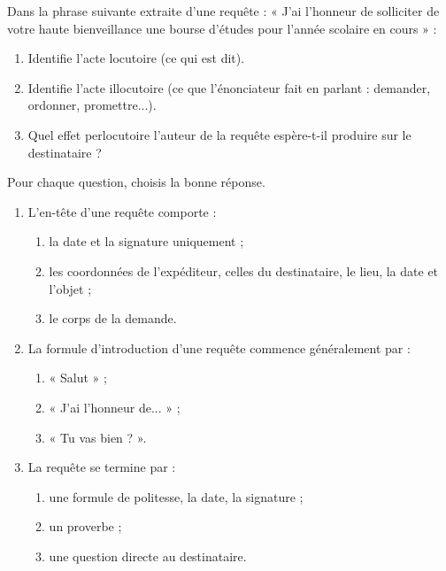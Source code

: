 \documentclass[11pt]{article}
\begin{document}
\begin{exercice}
Dans la phrase suivante extraite d'une requête : « J'ai l'honneur de solliciter de votre haute bienveillance une bourse d'études pour l'année scolaire en cours » :
\begin{enumerate}
\item Identifie l'acte locutoire (ce qui est dit).
\item Identifie l'acte illocutoire (ce que l'énonciateur fait en parlant : demander, ordonner, promettre...).
\item Quel effet perlocutoire l'auteur de la requête espère-t-il produire sur le destinataire ?
\end{enumerate}
\end{exercice}

\begin{exercice}
Pour chaque question, choisis la bonne réponse.
\begin{enumerate}
\item L'en-tête d'une requête comporte :
\begin{enumerate}
\item la date et la signature uniquement ;
\item les coordonnées de l'expéditeur, celles du destinataire, le lieu, la date et l'objet ;
\item le corps de la demande.
\end{enumerate}
\item La formule d'introduction d'une requête commence généralement par :
\begin{enumerate}
\item « Salut » ;
\item « J'ai l'honneur de... » ;
\item « Tu vas bien ? ».
\end{enumerate}
\item La requête se termine par :
\begin{enumerate}
\item une formule de politesse, la date, la signature ;
\item un proverbe ;
\item une question directe au destinataire.
\end{enumerate}
\end{enumerate}
\end{exercice}
\end{document}
